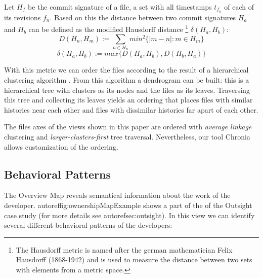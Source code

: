 \documentclass[10pt]{book}
\begin{document}
Let $H_f$ be the commit signature of a file, a set with all timestamps $t_{f_n}$ of each of its revisions $f_n$. Based on this the distance between two commit signatures $H_a$ and $H_b$ can be defined as the modified Hausdorff distance \footnote{The Hausdorff metric is named after the german mathematician Felix Hausdorff (1868-1942) and is used to measure the distance between two sets with elements from a metric space.} $\delta(H_a,H_b)$:
\[
D(H_n,H_m) := \sum_{n \in H_n} min^2 \{ \vert m -n \vert : m \in H_m \}
\]
\[
\delta(H_a,H_b) := max \{ D(H_a,H_b), D(H_b,H_a) \}
\]

With this metric we can order the files according to the result of a hierarchical clustering algorithm \cite{Jain99a}. From this algorithm a dendrogram can be built: this is a hierarchical tree with clusters as its nodes and the files as its leaves. Traversing this tree and collecting its leaves yields an ordering that places files with similar histories near each other and files with dissimilar histories far apart of each other.

The files axes of the \omap views shown in this paper are ordered with \textit{average linkage} clustering and \textit{larger-clusters-first} tree traversal. Nevertheless, our tool Chronia allows customization of the ordering.

\subsection{Behavioral Patterns}

The Overview Map reveals semantical information about the work of the developer. autoref{fig:ownershipMapExample} shows a part of the \omap of the Outsight case study (for more details see  autoref{sec:outsight}). In this view we can identify several different behavioral patterns of the developers:
\end{document}
